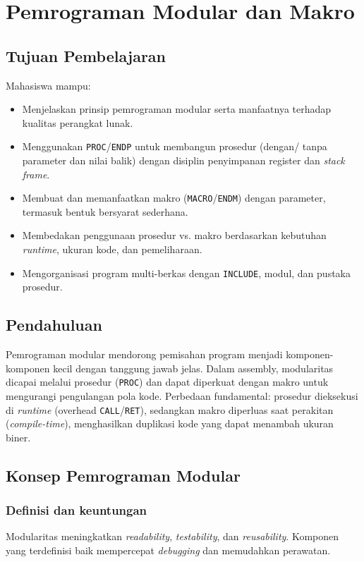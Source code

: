 \documentclass[../main.tex]{subfiles}
\begin{document}
\chapter{Pemrograman Modular dan Makro}

\section{Tujuan Pembelajaran}
Mahasiswa mampu:
\begin{itemize}
    \item Menjelaskan prinsip pemrograman modular serta manfaatnya terhadap kualitas perangkat lunak.
    \item Menggunakan \texttt{PROC}/\texttt{ENDP} untuk membangun prosedur (dengan/ tanpa parameter dan nilai balik) dengan disiplin penyimpanan register dan \textit{stack frame}.
    \item Membuat dan memanfaatkan makro (\texttt{MACRO}/\texttt{ENDM}) dengan parameter, termasuk bentuk bersyarat sederhana.
    \item Membedakan penggunaan prosedur vs. makro berdasarkan kebutuhan \textit{runtime}, ukuran kode, dan pemeliharaan.
    \item Mengorganisasi program multi-berkas dengan \texttt{INCLUDE}, modul, dan pustaka prosedur.
\end{itemize}

\section{Pendahuluan}
Pemrograman modular mendorong pemisahan program menjadi komponen-komponen kecil dengan tanggung jawab jelas. Dalam assembly, modularitas dicapai melalui prosedur (\texttt{PROC}) dan dapat diperkuat dengan makro untuk mengurangi pengulangan pola kode. Perbedaan fundamental: prosedur dieksekusi di \textit{runtime} (overhead \texttt{CALL}/\texttt{RET}), sedangkan makro diperluas saat perakitan (\textit{compile-time}), menghasilkan duplikasi kode yang dapat menambah ukuran biner.

\section{Konsep Pemrograman Modular}
\subsection{Definisi dan keuntungan}
Modularitas meningkatkan \textit{readability}, \textit{testability}, dan \textit{reusability}. Komponen yang terdefinisi baik mempercepat \textit{debugging} dan memudahkan perawatan.
\end{document}

